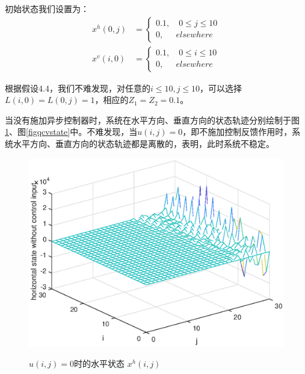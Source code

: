 	
	初始状态我们设置为：
	\begin{equation*}
	\begin{aligned}
	x^{h}(0, j)&=\begin{cases}
	0.1, \quad 0\leq j \leq 10 \\
	0, \quad \ \ elsewhere
	\end{cases} \\
	x^{v}(i, 0)&=\begin{cases}
	0.1, \quad 0\leq i \leq 10 \\
	0, \quad \ \ elsewhere
	\end{cases}
	\end{aligned}
	\end{equation*}
	
	根据假设4.4，我们不难发现，对任意的$i\leq10,j\leq10$，可以选择$L(i,0)=L(0,j)=1$，相应的$Z_1=Z_2=0.1$。
	
	当没有施加异步控制器时，系统在水平方向、垂直方向的状态轨迹分别绘制于图\ref{figqchstate}、图\ref{figqcvstate}中。不难发现，当$u(i,j)=0$，即不施加控制反馈作用时，系统水平方向、垂直方向的状态轨迹都是离散的，表明，此时系统不稳定。
	
	\begin{figure}[!htb]
		\centering\includegraphics[scale=0.6]{./figures/qc/simulation/hstateU0.eps}\\ 
		\caption{$u(i,j)=0$时的水平状态 $x^{h}(i,j)$}
		\label{figqchstate}
	\end{figure}
	
